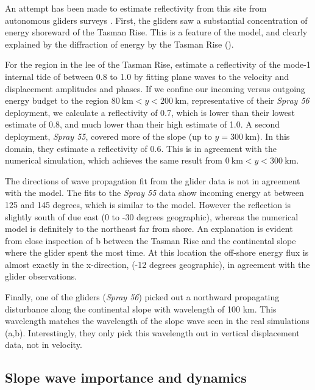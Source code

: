 \documentclass[10pt]{article}
\begin{document}
An attempt has been made to estimate reflectivity from this site from autonomous gliders surveys \citep{johnstonetal15}.  First, the gliders saw a substantial concentration of energy shoreward of the Tasman Rise.  This is a feature of the model, and clearly explained by the diffraction of energy by the Tasman Rise ().   

For the region in the lee of the Tasman Rise, \citet{johnstonetal15} estimate a reflectivity of the mode-1 internal tide of between 0.8 to 1.0 by fitting plane waves to the velocity and displacement amplitudes and phases.  If we confine our incoming versus outgoing energy budget to the region $80\ \mathrm{km}< y < 200\ \mathrm{km}$, representative of their \emph{Spray 56} deployment, we calculate a reflectivity of 0.7, which is lower than their lowest estimate of 0.8, and much lower than their high estimate of 1.0.  A second deployment, \emph{Spray 55}, covered more of the slope (up to $y=300\ \mathrm{km}$).  In this domain, they estimate a reflectivity of 0.6.  This is in agreement with the numerical simulation, which achieves  the same result from $0\ \mathrm{km}< y < 300\ \mathrm{km}$.  

The directions of wave propagation fit from the glider data is not in agreement with the model.  The fits to the \emph{Spray 55} data show incoming energy at between 125 and 145 degrees, which is similar to the model.  However the reflection is slightly south of due east (0 to -30 degrees geographic), whereas the numerical model is definitely to the northeast far from shore.  An explanation is evident from close inspection of b between the Tasman Rise and the continental slope where the glider spent the most time.  At this location the off-shore energy flux is almost exactly in the x-direction, (-12 degrees geographic), in agreement with the glider observations.  

Finally, one of the gliders (\emph{Spray 56}) picked out a northward propagating disturbance along the continental slope with wavelength of 100 km.  This wavelength matches the wavelength of the slope wave seen in the real simulations (a,b).  Interestingly, they only pick this wavelength out in vertical displacement data, not in velocity.  


\subsection{Slope wave importance and dynamics}
\end{document}
